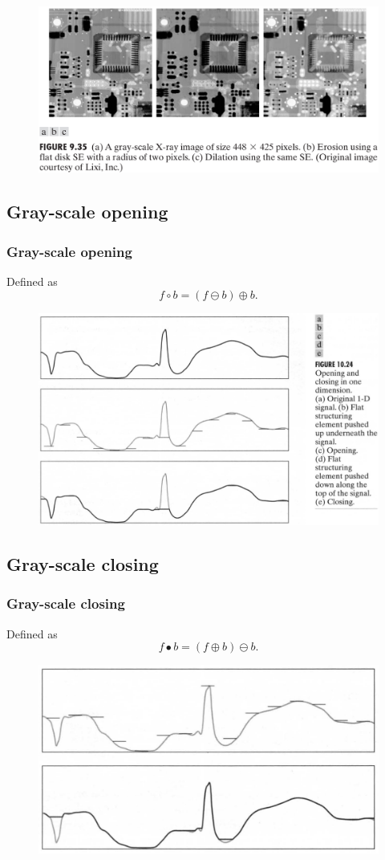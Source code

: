 \begin{frame}
\begin{figure}[!h]
\includegraphics[width=\textwidth]{fig-9-32.png}
\end{figure}
\end{frame}

\subsection{Gray-scale opening}

\begin{frame}
\frametitle{Gray-scale opening}
Defined as
\[
f \circ	b = (f \ominus b) \oplus b.
\]
\begin{figure}[!h]
\includegraphics[width=.7\textwidth]{fig-10-24.png}
\end{figure}
\end{frame}

\subsection{Gray-scale closing}

\begin{frame}
\frametitle{Gray-scale closing}
Defined as
\[
f \bullet b = (f \oplus b ) \ominus b.
\]
\begin{figure}[!h]
\includegraphics[width=.8\textwidth]{fig-10-24-2.png}
\end{figure}
\end{frame}


